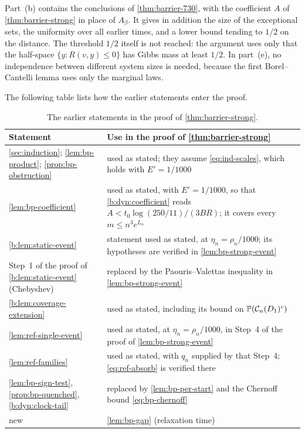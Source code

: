 Part~(b) contains the conclusions of \cref{thm:barrier-730}, with the coefficient $A$ of \cref{thm:barrier-strong} in place of $A_\beta$. It gives in addition the size of the exceptional sets, the uniformity over all earlier times, and a lower bound tending to $1/2$ on the distance. The threshold $1/2$ itself is not reached: the argument uses only that the half-space $\{y:R(v,y)\le0\}$ has Gibbs mass at least $1/2$. In part~(e), no independence between different system sizes is needed, because the first Borel--Cantelli lemma uses only the marginal laws.

The following table lists how the earlier statements enter the proof.

\begin{table}[ht]
\centering
\small
\begin{tabular}{@{}>{\raggedright\arraybackslash}p{}>{\raggedright\arraybackslash}p{}@{}}
\toprule
Statement & Use in the proof of \cref{thm:barrier-strong} \\
\midrule
\cref{sec:induction}; \cref{lem:bp-product}; \cref{prop:bp-obstruction} & used as stated; they assume \eqref{eq:ind-scales}, which holds with $E'=1/1000$ \\
\cref{lem:bp-coefficient} & used as stated, with $E'=1/1000$, so that \eqref{b:dyn:coefficient} reads $A<t_0\log(250/11)/(3BR)$; it covers every $m\le n^3e^{L_n}$ \\
\cref{b:lem:static-event} & statement used as stated, at $\eta_n=\rho_n/1000$; its hypotheses are verified in \cref{lem:bp-strong-event} \\
Step~1 of the proof of \cref{b:lem:static-event} (Chebyshev) & replaced by the Paouris--Valettas inequality in \cref{lem:bp-strong-event} \\
\cref{b:lem:coverage-extension} & used as stated, including its bound on $\mathbb P(\mathcal C_n(D_1)^c)$ \\
\cref{lem:ref-single-event} & used as stated, at $\eta_n=\rho_n/1000$, in Step~4 of the proof of \cref{lem:bp-strong-event} \\
\cref{lem:ref-families} & used as stated, with $q_n$ supplied by that Step~4; \eqref{eq:ref-absorb} is verified there \\
\cref{lem:bp-sign-test}, \cref{prop:bp-quenched}, \eqref{b:dyn:clock-tail} & replaced by \cref{lem:bp-per-start} and the Chernoff bound \eqref{eq:bp-chernoff} \\
new & \cref{lem:bp-gap} (relaxation time) \\
\bottomrule
\end{tabular}
\caption{The earlier statements in the proof of \cref{thm:barrier-strong}.}
\label{tab:bp-strong-uses}
\end{table}

